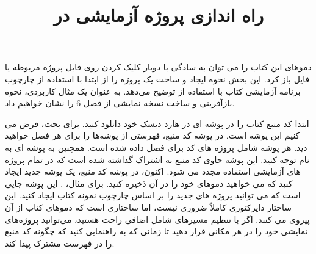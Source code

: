 \title{
    \LARGE
    \textbf{راه اندازی پروژه آزمایشی در }
} \rullFillWithLine[0.5em]{1pt}
\textbf{\vspace{12pt}}

{
    \Large
    دموهای این کتاب را می توان به سادگی با دوبار کلیک کردن روی فایل پروژه مربوطه  یا فایل  باز کرد.
    این بخش نحوه ایجاد و ساخت یک پروژه را از ابتدا با استفاده از چارچوب برنامه آزمایشی کتاب با استفاده از  توضیح می‌دهد.
    به عنوان یک مثال کاربردی، نحوه بازآفرینی و ساخت نسخه نمایشی  از فصل 6 را نشان خواهیم داد.
}
\textbf{\vspace{25pt}}

\title{
    \Large
}
\textbf{\vspace{12pt}}

{
    \Large
    ابتدا کد منبع کتاب را در پوشه ای در هارد دیسک خود دانلود کنید.
    برای بحث، فرض می کنیم این پوشه  است.
    در پوشه کد منبع، فهرستی از پوشه‌ها را برای هر فصل خواهید دید. هر پوشه شامل پروژه های کد برای فصل داده شده است.
    همچنین به پوشه ای به نام  توجه کنید. این پوشه حاوی کد منبع به اشتراک گذاشته شده است که در تمام پروژه های آزمایشی استفاده مجدد می شود.
    اکنون، در پوشه کد منبع، یک پوشه جدید ایجاد کنید که می خواهید دموهای خود را در آن ذخیره کنید. برای مثال، . این پوشه جایی است که می توانید پروژه های جدید را بر اساس چارچوب نمونه کتاب ایجاد کنید.
}
{
    \Large
    این ساختار دایرکتوری کاملاً ضروری نیست، اما ساختاری است که دموهای کتاب از آن پیروی می کنند. اگر با تنظیم مسیرهای شامل اضافی راحت هستید، می‌توانید پروژه‌های نمایشی خود را در هر مکانی قرار دهید تا زمانی که به  راهنمایی کنید که چگونه کد منبع را در فهرست مشترک پیدا کند.
}
\textbf{\vspace{25pt}}

\title{
    \Large
}
\textbf{\vspace{12pt}}


